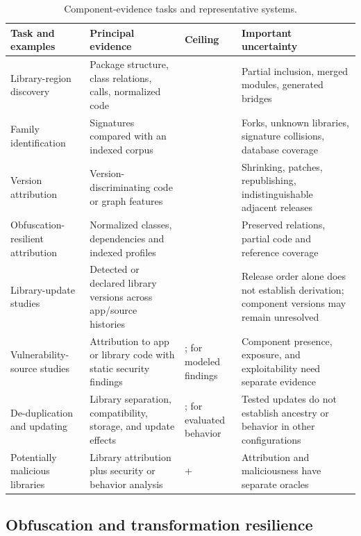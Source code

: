 \begin{table}[t]
\caption{Component-evidence tasks and representative systems.}
\label{tab:tpl-systems}
\small
\begin{tabularx}{\textwidth}{L{2.6cm}Y L{1.35cm}Y}
\toprule
Task and examples & Principal evidence & Ceiling & Important uncertainty \\
\midrule
Library-region discovery~\cite{libradar,libd,orlis} & Package structure, class relations, calls, normalized code &  & Partial inclusion, merged modules, generated bridges \\
Family identification~\cite{libscout,libid,tplprecision} & Signatures compared with an indexed corpus &  & Forks, unknown libraries, signature collisions, database coverage \\
Version attribution~\cite{atvhunter,osspolice} & Version-discriminating code or graph features &  & Shrinking, patches, republishing, indistinguishable adjacent releases \\
Obfuscation-resilient attribution~\cite{libid,orlis} & Normalized classes, dependencies and indexed profiles &  & Preserved relations, partial code and reference coverage \\
Library-update studies~\cite{keepupdated,developersupdate} & Detected or declared library versions across app/source histories &  & Release order alone does not establish derivation; component versions may remain unresolved \\
Vulnerability-source studies~\cite{originsvuln} & Attribution to app or library code with static security findings & ;  for modeled findings & Component presence, exposure, and exploitability need separate evidence \\
De-duplication and updating~\cite{appcommune} & Library separation, compatibility, storage, and update effects & ;  for evaluated behavior & Tested updates do not establish ancestry or behavior in other configurations \\
Potentially malicious libraries~\cite{malicioustpl} & Library attribution plus security or behavior analysis & + & Attribution and maliciousness have separate oracles \\
\bottomrule
\end{tabularx}
\end{table}

\subsection{Obfuscation and transformation resilience}

